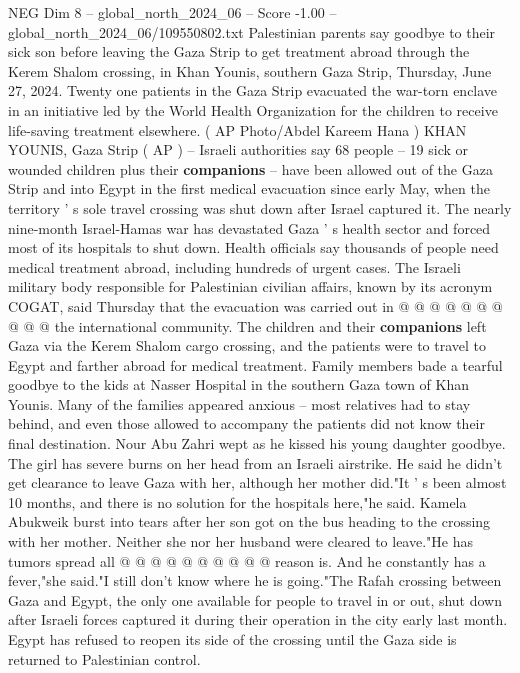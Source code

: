 \begin{textsample}{NEG Dim 8 – global\_north\_2024\_06 – Score -1.00 – global\_north\_2024\_06/109550802.txt}  \label{ex:f8_neg_390}
Palestinian parents say goodbye to their sick son before leaving the Gaza Strip to get treatment abroad through the Kerem Shalom crossing, in Khan Younis, southern Gaza Strip, Thursday, June 27, 2024.
Twenty one patients in the Gaza Strip evacuated the war-torn enclave in an initiative led by the World Health Organization for the children to receive life-saving treatment elsewhere. ( AP Photo/Abdel Kareem Hana ) KHAN YOUNIS, Gaza Strip ( AP ) -- Israeli authorities say 68 people -- 19 sick or wounded children plus their \textbf{companions} -- have been allowed out of the Gaza Strip and into Egypt in the first medical evacuation since early May, when the territory ' s sole travel crossing was shut down after Israel captured it.
The nearly nine-month Israel-Hamas war has devastated Gaza ' s health sector and forced most of its hospitals to shut down.
Health officials say thousands of people need medical treatment abroad, including hundreds of urgent cases.
The Israeli military body responsible for Palestinian civilian affairs, known by its acronym COGAT, said Thursday that the evacuation was carried out in @ @ @ @ @ @ @ @ @ @ the international community.
The children and their \textbf{companions} left Gaza via the Kerem Shalom cargo crossing, and the patients were to travel to Egypt and farther abroad for medical treatment.
Family members bade a tearful goodbye to the kids at Nasser Hospital in the southern Gaza town of Khan Younis.
Many of the families appeared anxious -- most relatives had to stay behind, and even those allowed to accompany the patients did not know their final destination.
Nour Abu Zahri wept as he kissed his young daughter goodbye.
The girl has severe burns on her head from an Israeli airstrike.
He said he didn't get clearance to leave Gaza with her, although her mother did."It ' s been almost 10 months, and there is no solution for the hospitals here,"he said.
Kamela Abukweik burst into tears after her son got on the bus heading to the crossing with her mother.
Neither she nor her husband were cleared to leave."He has tumors spread all @ @ @ @ @ @ @ @ @ @ reason is.
And he constantly has a fever,"she said."I still don't know where he is going."The Rafah crossing between Gaza and Egypt, the only one available for people to travel in or out, shut down after Israeli forces captured it during their operation in the city early last month.
Egypt has refused to reopen its side of the crossing until the Gaza side is returned to Palestinian control.

\end{textsample}
